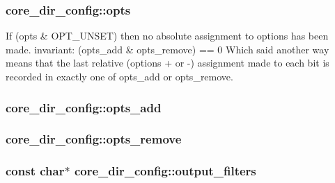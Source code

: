 \subsubsection[{\texorpdfstring{opts}{opts}}]{ core\+\_\+dir\+\_\+config\+::opts}\hypertarget{structcore__dir__config_a040a02db82f60403e572e0b42f67ed4a}{}\label{structcore__dir__config_a040a02db82f60403e572e0b42f67ed4a}
If (opts \& O\+P\+T\+\_\+\+U\+N\+S\+ET) then no absolute assignment to options has been made. invariant\+: (opts\+\_\+add \& opts\+\_\+remove) == 0 Which said another way means that the last relative (options + or -\/) assignment made to each bit is recorded in exactly one of opts\+\_\+add or opts\+\_\+remove. 
\subsubsection[{\texorpdfstring{opts\+\_\+add}{opts_add}}]{ core\+\_\+dir\+\_\+config\+::opts\+\_\+add}\hypertarget{structcore__dir__config_a7b6c01d92223dd4e009baded4e6cd4cb}{}\label{structcore__dir__config_a7b6c01d92223dd4e009baded4e6cd4cb}
\subsubsection[{\texorpdfstring{opts\+\_\+remove}{opts_remove}}]{ core\+\_\+dir\+\_\+config\+::opts\+\_\+remove}\hypertarget{structcore__dir__config_af04c3013704ea3938b340c6cff39c35c}{}\label{structcore__dir__config_af04c3013704ea3938b340c6cff39c35c}
\subsubsection[{\texorpdfstring{output\+\_\+filters}{output_filters}}]{\setlength{\rightskip}{0pt plus 5cm}const char$\ast$ core\+\_\+dir\+\_\+config\+::output\+\_\+filters}\hypertarget{structcore__dir__config_a3ab3258a9e908ce0d01c836f7ca7ddce}{}\label{structcore__dir__config_a3ab3258a9e908ce0d01c836f7ca7ddce}

